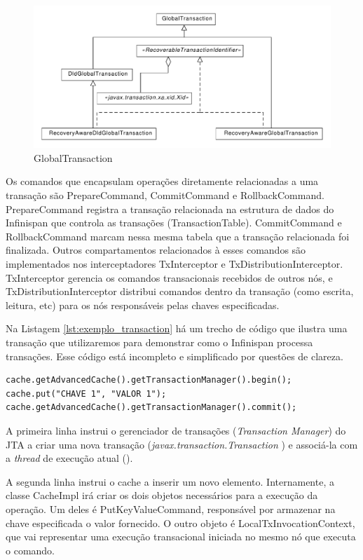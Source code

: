 \documentclass[11pt,twoside,a4paper]{book}
\begin{document}
\begin{figure}
  \centering
  \includegraphics[width=\textwidth]{global_transaction} 
  \caption{GlobalTransaction}
  \label{fig:global_transaction} 
\end{figure}

Os comandos que encapsulam operações diretamente relacionadas a uma transação são PrepareCommand, CommitCommand e RollbackCommand. PrepareCommand registra a transação relacionada na estrutura de dados do Infinispan que controla as transações (TransactionTable). CommitCommand e RollbackCommand marcam nessa mesma tabela que a transação relacionada foi finalizada. Outros compartamentos relacionados à esses comandos são implementados nos interceptadores TxInterceptor e TxDistributionInterceptor. TxInterceptor gerencia os comandos transacionais recebidos de outros nós, e TxDistributionInterceptor distribui comandos dentro da transação (como escrita, leitura, etc) para os nós responsáveis pelas chaves especificadas.

Na Listagem \ref{lst:exemplo_transaction} há um trecho de código que ilustra uma transação que utilizaremos para demonstrar como o Infinispan processa transações. Esse código está incompleto e simplificado por questões de clareza.

\begin{lstlisting}[caption={Transação convencional}, label=lst:exemplo_transaction]
cache.getAdvancedCache().getTransactionManager().begin();
cache.put("CHAVE 1", "VALOR 1");
cache.getAdvancedCache().getTransactionManager().commit();
\end{lstlisting}

A primeira linha instrui o gerenciador de transações (\emph{Transaction Manager}) do JTA a criar uma nova transação (\emph{javax.transaction.Transaction} \cite{jta}) e associá-la com a \emph{thread} de execução atual (\cite{ipc}). 

A segunda linha instrui o cache a inserir um novo elemento. Internamente, a classe CacheImpl irá criar os dois objetos necessários para a execução da operação. Um deles é PutKeyValueCommand, responsável por armazenar na chave especificada o valor fornecido. O outro objeto é LocalTxInvocationContext, que vai representar uma execução transacional iniciada no mesmo nó que executa o comando. 
\end{document}
